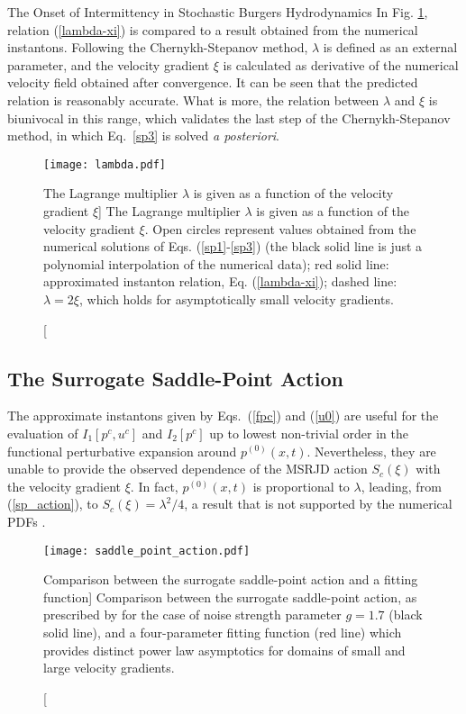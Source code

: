 \begin{chapter}{The Onset of Intermittency in Stochastic Burgers Hydrodynamics}
In Fig. \ref{lambda_fig}, relation (\ref{lambda-xi}) is compared to a result obtained from the numerical instantons.  Following the Chernykh-Stepanov method, $\lambda$ is defined as an external parameter, and the velocity gradient $\xi$ is calculated as derivative of the numerical velocity field obtained after convergence. It can be seen that the predicted relation is reasonably accurate. What is more, the relation between $\lambda$ and $\xi$ is biunivocal in this range, which validates the last step of the Chernykh-Stepanov method, in which Eq.~\eqref{sp3} is solved \textit{a posteriori}.

\begin{figure}[ht]
\centering
\texttt{[image: lambda.pdf]}
\caption
[The Lagrange multiplier $\lambda$ is given as a function of the velocity gradient $\xi$]
{The Lagrange multiplier $\lambda$ is given as a function of the velocity gradient $\xi$. Open circles represent values obtained from the numerical solutions of Eqs. (\ref{sp1}-\ref{sp3}) (the black solid line is just a polynomial interpolation of the numerical data); red solid line: approximated instanton relation, Eq. (\ref{lambda-xi}); dashed line: $\lambda = 2 \xi$, which holds for asymptotically small velocity gradients.
}
\label{lambda_fig}
\end{figure}

\subsection{The Surrogate Saddle-Point Action}

The approximate instantons given by Eqs.~(\ref{fpc}) and (\ref{u0}) are useful for the evaluation of $I_1 [p^c,u^c]$ and $I_2 [p^c]$ up to lowest non-trivial order in the functional perturbative expansion around $p^{(0)}(x,t)$. Nevertheless, they are unable to provide the observed dependence of the MSRJD action $S_c(\xi)$ with the velocity gradient $\xi$. In fact, $p^{(0)}(x,t)$ is proportional to $\lambda$, leading, from (\ref{sp_action}), to $S_c(\xi) = \lambda^2/4$, a result that is not supported by the numerical PDFs \textcite{grafke2015relevance}.

\begin{figure}[ht]
    \centering
    \texttt{[image: saddle\_point\_action.pdf]}
    \caption
    [Comparison between the surrogate saddle-point action and a fitting function]
    {Comparison between the surrogate saddle-point action, as prescribed by \textcite{grafke2015relevance} for the case of noise strength parameter $g=1.7$ (black solid line), and a four-parameter fitting function (red line) which provides distinct power law asymptotics for domains of small and large velocity gradients.}
    \label{surrogate_action}
\end{figure}


\end{chapter}
